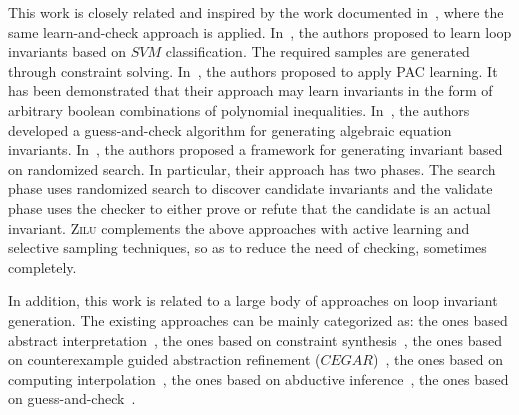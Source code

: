 This work is closely related and inspired by the work documented in~\cite{sharma2012interpolants,sharma2013verification,DBLP:conf/esop/0001GHALN13,sharma2014invariant}, where the same learn-and-check approach is applied. 
In~\cite{sharma2012interpolants}, the authors proposed to learn loop invariants based on $\mathit{SVM}$ classification. 
The required samples are generated through constraint solving. In~\cite{sharma2013verification}, the authors proposed to apply PAC learning. 
It has been demonstrated that their approach may learn invariants in the form of arbitrary boolean
combinations of polynomial inequalities. In~\cite{DBLP:conf/esop/0001GHALN13}, the authors developed a guess-and-check algorithm for generating algebraic equation invariants. 
In~\cite{sharma2014invariant}, the authors proposed a framework for generating invariant based on randomized search. 
In particular, their approach has two phases. 
The search phase uses randomized search to discover candidate invariants and the validate phase uses the checker to either prove or refute that the candidate is an actual invariant. 
\textsc{Zilu} complements the above approaches with active learning and selective sampling techniques, so as to reduce the need of checking, sometimes completely.

In addition, this work is related to a large body of approaches on loop invariant generation. The existing approaches can be mainly categorized as:
the ones based abstract interpretation~\cite{cousot1978automatic,mine2006octagon,cousot1979systematic,karr1976affine,vincent2009subpolyhedra}, 
the ones based on constraint synthesis~\cite{ashutosh2009invgen,michael2003linear,sumit2009constraint}, 
the ones based on counterexample guided abstraction refinement ($\mathit{CEGAR}$)~\cite{henzinger2003software,thomas2001slam,edmund2003counterexample}, 
the ones based on computing interpolation~\cite{kenneth2010lazy,thomas2004abstractions,kenneth2003interpolation,Kenneth2006lazy}, 
the ones based on abductive inference~\cite{isil2013inductive}, 
the ones based on guess-and-check~\cite{cormac2001houdini,ernst2007daikon}.

